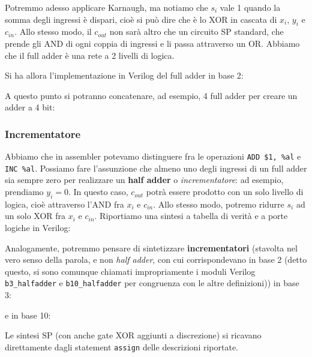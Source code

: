 \documentclass[a4paper,11pt]{article}
\begin{document}
Potremmo adesso applicare Karnaugh, ma notiamo che $s_i$ vale 1 quando la somma degli ingressi è dispari, cioè si può dire che è lo XOR in cascata di $x_i$, $y_i$ e $c_{in}$. 
Allo stesso modo, il $c_{out}$ non sarà altro che un circuito SP standard, che prende gli AND di ogni coppia di ingressi e li passa attraverso un OR.
Abbiamo che il full adder è una rete a 2 livelli di logica.

Si ha allora l'implementazione in Verilog del full adder in base 2:



A questo punto si potranno concatenare, ad esempio, 4 full adder per creare un adder a 4 bit:



\subsubsection{Incrementatore}
Abbiamo che in assembler potevamo distinguere fra le operazioni \lstinline|ADD $1, %al| e \lstinline|INC %al|.
Possiamo fare l'assunzione che almeno uno degli ingressi di un full adder sia sempre zero per realizzare un \textbf{half adder} o \textit{incrementatore}: ad esempio, prendiamo $y_i = 0$. 
In questo caso, $c_{out}$ potrà essere prodotto con un solo livello di logica, cioè attraverso l'AND fra $x_i$ e $c_{in}$.
Allo stesso modo, potremo ridurre $s_i$ ad un solo XOR fra $x_i$ e $c_{in}$.
Riportiamo una sintesi a tabella di verità e a porte logiche in Verilog:



Analogamente, potremmo pensare di sintetizzare \textbf{incrementatori} (stavolta nel vero senso della parola, e non \textit{half adder}, con cui corrispondevano in base 2 (detto questo, si sono comunque chiamati impropriamente i moduli Verilog \lstinline|b3_halfadder| e \lstinline|b10_halfadder| per congruenza con le altre definizioni)) in base 3: 



e in base 10: 



Le sintesi SP (con anche gate XOR aggiunti a discrezione) si ricavano direttamente dagli statement \lstinline|assign| delle descrizioni riportate.
\end{document}

